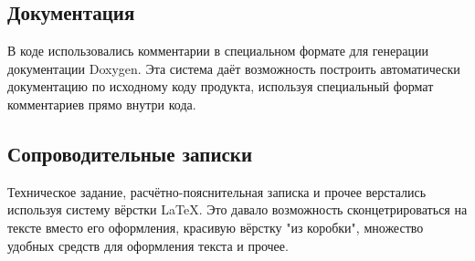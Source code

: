 \documentclass[a4paper,12pt]{report}
\begin{document}
\subsection{Документация}
В коде использовались комментарии в специальном формате для генерации документации Doxygen. Эта система даёт возможность построить автоматически документацию по исходному коду продукта, используя специальный формат комментариев прямо внутри кода.

\subsection{Сопроводительные записки}
Техническое задание, расчётно-пояснительная записка и прочее верстались используя систему вёрстки \LaTeX . Это давало возможность сконцетрироваться на тексте вместо его оформления, красивую вёрстку "из коробки", множество удобных средств для оформления текста и прочее.
\end{document}
